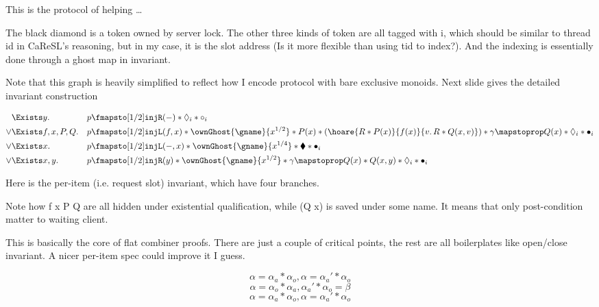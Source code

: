 \documentclass[10pt]{article}
\newcommand{\bdia}{\blacklozenge}
\newcommand{\dia}{\Diamond}
\newcommand{\injR}{\texttt{injR}}
\newcommand{\injL}{\texttt{injL}}
\begin{document}
This is the protocol of helping … 

The black diamond is a token owned by server lock.
The other three kinds of token are all tagged with i, which should be similar to thread id in CaReSL’s reasoning, but in my case, it is the slot address (Is it more flexible than using tid to index?). And the indexing is essentially done through a ghost map in invariant. 

Note that this graph is heavily simplified to reflect how I encode protocol with bare exclusive monoids. Next slide gives the detailed invariant construction


\begin{align*}
     &\Exists y.          &&p \fmapsto[1/2] \injR(-) * \dia_i * \circ_i\\
\lor &\Exists f, x, P, Q. &&p \fmapsto[1/2] \injL(f, x) * \ownGhost{\gname}{x^{1/2}} *
                           P(x) * (\hoare{R * P(x)}{f(x)}{v.\,R * Q(x, v)}) * \gamma \mapstoprop Q(x) * \dia_i * \bullet_i\\
\lor &\Exists x.          &&p \fmapsto[1/2] \injL(-, x) * \ownGhost{\gname}{x^{1/4}} * \bdia * \bullet_i\\
\lor &\Exists x, y.       &&p \fmapsto[1/2] \injR(y) * \ownGhost{\gname}{x^{1/2}} * \gamma \mapstoprop Q(x) * Q(x, y) * \dia_i * \bullet_i
\end{align*}

Here is the per-item (i.e. request slot) invariant, which have four branches.

Note how f x P Q are all hidden under existential qualification, while (Q x) is saved under some name. It means that only post-condition matter to waiting client.

This is basically the core of flat combiner proofs. There are just a couple of critical points, the rest are all boilerplates like open/close invariant. A nicer per-item spec could improve it I guess.

\[\alpha = \alpha_a * \alpha_o, \alpha = \alpha_a' * \alpha_o\]
\[\alpha = \alpha_o * \alpha_a, \alpha_a' * \alpha_o = \beta\]
\[\alpha = \alpha_a * \alpha_o, \alpha = \alpha_a' * \alpha_o\]
\end{document}
